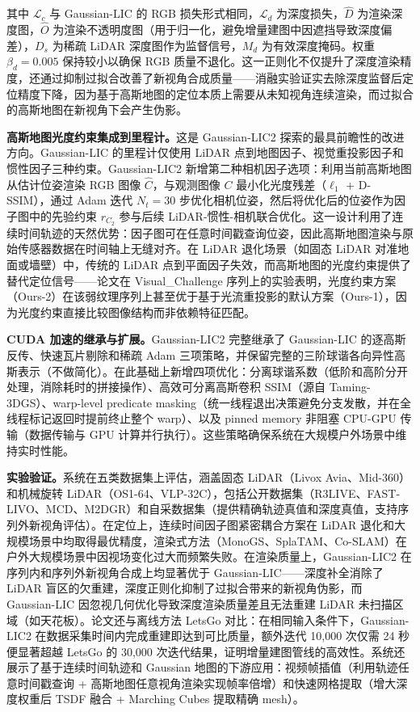 其中 $\mathcal{L}_c$ 与 Gaussian-LIC 的 RGB 损失形式相同，$\mathcal{L}_d$ 为深度损失，$\hat{D}$ 为渲染深度图，$\hat{O}$ 为渲染不透明度图（用于归一化，避免增量建图中因遮挡导致深度偏差），$D_s$ 为稀疏 LiDAR 深度图作为监督信号，$M_d$ 为有效深度掩码。权重 $\beta_d = 0.005$ 保持较小以确保 RGB 质量不退化。这一正则化不仅提升了深度渲染精度，还通过抑制过拟合改善了新视角合成质量——消融实验证实去除深度监督后定位精度下降，因为基于高斯地图的定位本质上需要从未知视角连续渲染，而过拟合的高斯地图在新视角下会产生伪影。

\textbf{高斯地图光度约束集成到里程计。}这是 Gaussian-LIC2 探索的最具前瞻性的改进方向。Gaussian-LIC 的里程计仅使用 LiDAR 点到地图因子、视觉重投影因子和惯性因子三种约束。Gaussian-LIC2 新增第二种相机因子选项：利用当前高斯地图从估计位姿渲染 RGB 图像 $\hat{C}$，与观测图像 $C$ 最小化光度残差（$\ell_1$ + D-SSIM），通过 Adam 迭代 $N_t=30$ 步优化相机位姿，然后将优化后的位姿作为因子图中的先验约束 $r_{C_2}$ 参与后续 LiDAR-惯性-相机联合优化。这一设计利用了连续时间轨迹的天然优势：因子图可在任意时间戳查询位姿，因此高斯地图渲染与原始传感器数据在时间轴上无缝对齐。在 LiDAR 退化场景（如固态 LiDAR 对准地面或墙壁）中，传统的 LiDAR 点到平面因子失效，而高斯地图的光度约束提供了替代定位信号——论文在 Visual\_Challenge 序列上的实验表明，光度约束方案（Ours-2）在该弱纹理序列上甚至优于基于光流重投影的默认方案（Ours-1），因为光度约束直接比较图像结构而非依赖特征匹配。

\textbf{CUDA 加速的继承与扩展。}Gaussian-LIC2 完整继承了 Gaussian-LIC 的逐高斯反传、快速瓦片剔除和稀疏 Adam 三项策略，并保留完整的三阶球谐各向异性高斯表示（不做简化）。在此基础上新增四项优化：分离球谐系数（低阶和高阶分开处理，消除耗时的拼接操作）、高效可分离高斯卷积 SSIM（源自 Taming-3DGS）、warp-level predicate masking（统一线程退出决策避免分支发散，并在全线程标记返回时提前终止整个 warp）、以及 pinned memory 非阻塞 CPU-GPU 传输（数据传输与 GPU 计算并行执行）。这些策略确保系统在大规模户外场景中维持实时性能。

\textbf{实验验证。}系统在五类数据集上评估，涵盖固态 LiDAR（Livox Avia、Mid-360）和机械旋转 LiDAR（OS1-64、VLP-32C），包括公开数据集（R3LIVE、FAST-LIVO、MCD、M2DGR）和自采数据集（提供精确轨迹真值和深度真值，支持序列外新视角评估）。在定位上，连续时间因子图紧密耦合方案在 LiDAR 退化和大规模场景中均取得最优精度，渲染式方法（MonoGS、SplaTAM、Co-SLAM）在户外大规模场景中因视场变化过大而频繁失败。在渲染质量上，Gaussian-LIC2 在序列内和序列外新视角合成上均显著优于 Gaussian-LIC——深度补全消除了 LiDAR 盲区的欠重建，深度正则化抑制了过拟合带来的新视角伪影，而 Gaussian-LIC 因忽视几何优化导致深度渲染质量差且无法重建 LiDAR 未扫描区域（如天花板）。论文还与离线方法 LetsGo 对比：在相同输入条件下，Gaussian-LIC2 在数据采集时间内完成重建即达到可比质量，额外迭代 10,000 次仅需 24 秒便显著超越 LetsGo 的 30,000 次迭代结果，证明增量建图管线的高效性。系统还展示了基于连续时间轨迹和 Gaussian 地图的下游应用：视频帧插值（利用轨迹任意时间戳查询 + 高斯地图任意视角渲染实现帧率倍增）和快速网格提取（增大深度权重后 TSDF 融合 + Marching Cubes 提取精确 mesh）。

